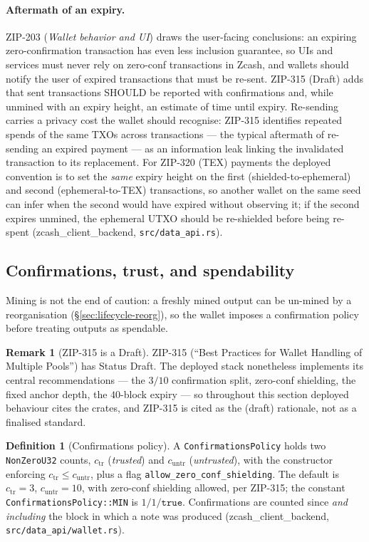 \documentclass[11pt,a4paper]{article}
\theoremstyle{definition}
\newtheorem{definition}[theorem]{Definition}
\newtheorem{remark}[theorem]{Remark}
\begin{document}
\paragraph{Aftermath of an expiry.} ZIP-203 (\emph{Wallet behavior and UI})
draws the user-facing conclusions: an expiring zero-confirmation
transaction has even less inclusion guarantee, so UIs and services must
never rely on zero-conf transactions in Zcash, and wallets should notify
the user of expired transactions that must be re-sent. ZIP-315 (Draft) adds
that sent transactions SHOULD be reported with confirmations and, while
unmined with an expiry height, an estimate of time until expiry. Re-sending
carries a privacy cost the wallet should recognise: ZIP-315 identifies
repeated spends of the same TXOs across transactions --- the typical
aftermath of re-sending an expired payment --- as an information leak
linking the invalidated transaction to its replacement. For ZIP-320 (TEX)
payments the deployed convention is to set the \emph{same} expiry height on
the first (shielded-to-ephemeral) and second (ephemeral-to-TEX)
transactions, so another wallet on the same seed can infer when the second
would have expired without observing it; if the second expires unmined, the
ephemeral UTXO should be re-shielded before being re-spent
(\textsf{zcash\_client\_backend}, \texttt{src/data\_api.rs}).

\subsection{Confirmations, trust, and spendability}\label{sec:lifecycle-spend}

Mining is not the end of caution: a freshly mined output can be un-mined by
a reorganisation (\S\ref{sec:lifecycle-reorg}), so the wallet imposes a
confirmation policy before treating outputs as spendable.

\begin{remark}[ZIP-315 is a Draft]\label{rem:lifecycle-zip315}
ZIP-315 (``Best Practices for Wallet Handling of Multiple Pools'') has
Status Draft. The deployed stack nonetheless implements its central
recommendations --- the $3/10$ confirmation split, zero-conf shielding, the
fixed anchor depth, the $40$-block expiry --- so throughout this section
deployed behaviour cites the crates, and ZIP-315 is cited as the (draft)
rationale, not as a finalised standard.
\end{remark}

\begin{definition}[Confirmations policy]\label{def:lifecycle-confpolicy}
A \texttt{ConfirmationsPolicy} holds two \texttt{NonZeroU32} counts,
$c_{\mathrm{tr}}$ (\emph{trusted}) and $c_{\mathrm{untr}}$
(\emph{untrusted}), with the constructor enforcing
$c_{\mathrm{tr}} \le c_{\mathrm{untr}}$, plus a flag
\texttt{allow\_zero\_conf\_shielding}. The default is
$c_{\mathrm{tr}} = 3$, $c_{\mathrm{untr}} = 10$, with zero-conf shielding
allowed, per ZIP-315; the constant \texttt{ConfirmationsPolicy::MIN} is
$1/1/\mathtt{true}$.
Confirmations are counted since \emph{and including} the block in which a
note was produced
(\textsf{zcash\_client\_backend}, \texttt{src/data\_api/wallet.rs}).
\end{definition}
\end{document}
